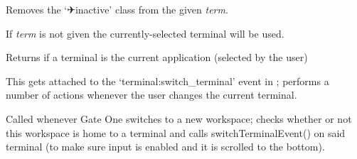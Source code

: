 \documentclass[letterpaper,10pt,openany]{sphinxmanual}
\begin{document}

\begin{fulllineitems}
\label{Applications/terminal/js_terminal:GateOne.Terminal.setActive}
Removes the `✈inactive' class from the given \emph{term}.

If \emph{term} is not given the currently-selected terminal will be used.

\end{fulllineitems}


\begin{fulllineitems}
\label{Applications/terminal/js_terminal:GateOne.Terminal.isActive}
Returns  if a terminal is the current application (selected by the user)

\end{fulllineitems}


\begin{fulllineitems}
\label{Applications/terminal/js_terminal:GateOne.Terminal.switchTerminalEvent}
This gets attached to the `terminal:switch\_terminal' event in ; performs a number of actions whenever the user changes the current terminal.

\end{fulllineitems}


\begin{fulllineitems}
\label{Applications/terminal/js_terminal:GateOne.Terminal.switchWorkspaceEvent}
Called whenever Gate One switches to a new workspace; checks whether or not this workspace is home to a terminal and calls switchTerminalEvent() on said terminal (to make sure input is enabled and it is scrolled to the bottom).

\end{fulllineitems}
\end{document}
